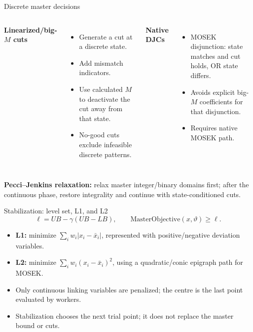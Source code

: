 \documentclass[aspectratio=169,10pt]{beamer}
\begin{document}
\begin{frame}{Discrete master decisions}
\begin{columns}[T]
\textbf{Linearized/big-$M$ cuts}
\begin{itemize}\item Generate a cut at a discrete state.\item Add mismatch indicators.\item Use calculated $M$ to deactivate the cut away from that state.\item No-good cuts exclude infeasible discrete patterns.\end{itemize}
\textbf{Native DJCs}
\begin{itemize}\item MOSEK disjunction: state matches and cut holds, OR state differs.\item Avoids explicit big-$M$ coefficients for that disjunction.\item Requires native MOSEK path.\end{itemize}
\end{columns}
\vspace{2mm}
\textbf{Pecci--Jenkins relaxation:} relax master integer/binary domains first; after the continuous phase, restore integrality and continue with state-conditioned cuts.
\end{frame}

\begin{frame}{Stabilization: level set, L1, and L2}
\[
\ell=UB-\gamma(UB-LB),\qquad
\mathrm{MasterObjective}(x,\vartheta)\geq\ell.
\]
\begin{itemize}
\item \textbf{L1:} minimize $\sum_i w_i|x_i-\bar{x}_i|$, represented with positive/negative deviation variables.
\item \textbf{L2:} minimize $\sum_i w_i(x_i-\bar{x}_i)^2$, using a quadratic/conic epigraph path for MOSEK.
\item Only continuous linking variables are penalized; the centre is the last point evaluated by workers.
\item Stabilization chooses the next trial point; it does not replace the master bound or cuts.
\end{itemize}
\end{frame}
\end{document}
